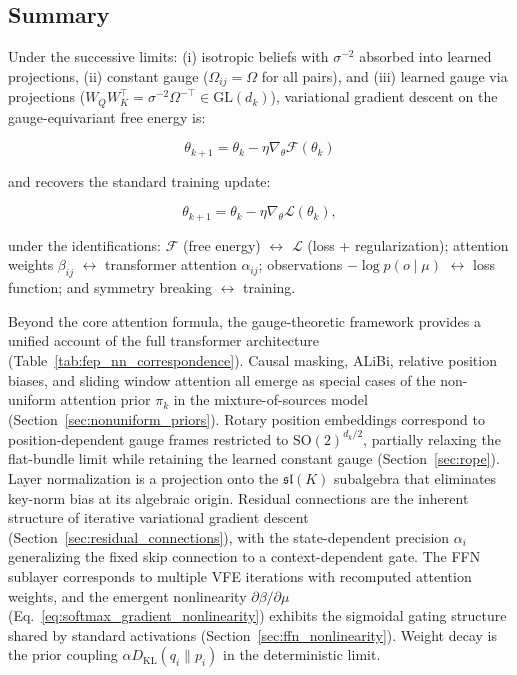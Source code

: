\documentclass[twoside,11pt]{article}
\begin{document}
\subsection{Summary}

Under the successive limits: (i) isotropic beliefs with $\sigma^{-2}$ absorbed into learned projections, (ii) constant gauge ($\Omega_{ij} = \Omega$ for all pairs), and (iii) learned gauge via projections ($W_Q W_K^\top = \sigma^{-2}\Omega^{-\top} \in \mathrm{GL}(d_k)$), variational gradient descent on the gauge-equivariant free energy is:

\begin{equation}
\theta_{k+1} = \theta_k - \eta \nabla_\theta \mathcal{F}(\theta_k)
\end{equation}

and recovers the standard training update:

\begin{equation}
\theta_{k+1} = \theta_k - \eta \nabla_\theta \mathcal{L}(\theta_k),
\end{equation}

under the identifications: $\mathcal{F}$ (free energy) $\leftrightarrow$ $\mathcal{L}$ (loss + regularization); attention weights $\beta_{ij}$ $\leftrightarrow$ transformer attention $\alpha_{ij}$; observations $-\log p(o \mid \mu)$ $\leftrightarrow$ loss function; and symmetry breaking $\leftrightarrow$ training.

Beyond the core attention formula, the gauge-theoretic framework provides a unified account of the full transformer architecture (Table~\ref{tab:fep_nn_correspondence}). Causal masking, ALiBi, relative position biases, and sliding window attention all emerge as special cases of the non-uniform attention prior $\pi_k$ in the mixture-of-sources model (Section~\ref{sec:nonuniform_priors}). Rotary position embeddings correspond to position-dependent gauge frames restricted to $\mathrm{SO}(2)^{d_k/2}$, partially relaxing the flat-bundle limit while retaining the learned constant gauge (Section~\ref{sec:rope}). Layer normalization is a projection onto the $\mathfrak{sl}(K)$ subalgebra that eliminates key-norm bias at its algebraic origin. Residual connections are the inherent structure of iterative variational gradient descent (Section~\ref{sec:residual_connections}), with the state-dependent precision $\alpha_i$ generalizing the fixed skip connection to a context-dependent gate. The FFN sublayer corresponds to multiple VFE iterations with recomputed attention weights, and the emergent nonlinearity $\partial \beta/\partial \mu$ (Eq.~\ref{eq:softmax_gradient_nonlinearity}) exhibits the sigmoidal gating structure shared by standard activations (Section~\ref{sec:ffn_nonlinearity}). Weight decay is the prior coupling $\alpha D_{\mathrm{KL}}(q_i \| p_i)$ in the deterministic limit.
\end{document}
